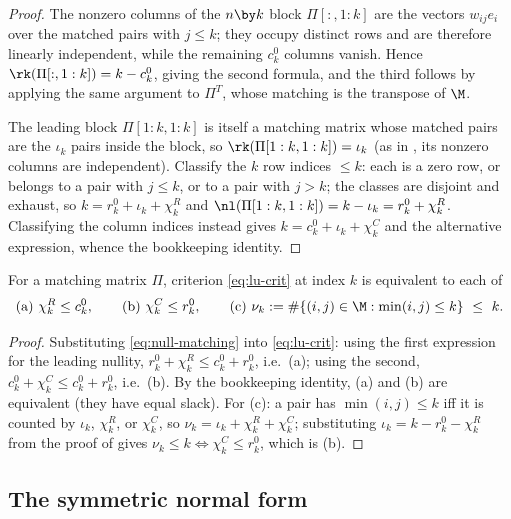 \begin{proof}
  The nonzero columns of the $n \by k$ block $\Pi[:,1:k]$ are the vectors
  $w_{ij} e_i$ over the matched pairs with $j \le k$; they occupy distinct
  rows and are therefore linearly independent, while the remaining $c^0_k$
  columns vanish.  Hence $\rk(\Pi[:,1:k]) = k - c^0_k$, giving the second
  formula, and the third follows by applying the same argument to $\Pi^T$,
  whose matching is the transpose of $\M$.

  The leading block $\Pi[1:k,1:k]$ is itself a matching matrix whose
  matched pairs are the $\iota_k$ pairs inside the block, so
  $\rk(\Pi[1:k,1:k]) = \iota_k$ (as in , its nonzero
  columns are independent).  Classify the $k$ row indices $\le k$: each is
  a zero row, or belongs to a pair with $j \le k$, or to a pair with
  $j > k$; the classes are disjoint and exhaust, so
  $k = r^0_k + \iota_k + \chi^R_k$ and
  $\nl(\Pi[1:k,1:k]) = k - \iota_k = r^0_k + \chi^R_k$.  Classifying the
  column indices instead gives $k = c^0_k + \iota_k + \chi^C_k$ and the
  alternative expression, whence the bookkeeping identity.
\end{proof}

\begin{lemma}\label{lem:comb-lu}
  For a matching matrix $\Pi$, criterion \cref{eq:lu-crit} at index $k$ is
  equivalent to each of
  \[
    \text{(a) } \chi^R_k \le c^0_k,
    \qquad
    \text{(b) } \chi^C_k \le r^0_k,
    \qquad
    \text{(c) } \nu_k := \#\{(i,j) \in \M : \min(i,j) \le k\} \ \le\ k .
  \]
\end{lemma}

\begin{proof}
  Substituting \cref{eq:null-matching} into \cref{eq:lu-crit}: using the
  first expression for the leading nullity,
  $r^0_k + \chi^R_k \le c^0_k + r^0_k$, i.e.\ (a); using the second,
  $c^0_k + \chi^C_k \le c^0_k + r^0_k$, i.e.\ (b).  By the bookkeeping
  identity, (a) and (b) are equivalent (they have equal slack).  For (c):
  a pair has $\min(i,j) \le k$ iff it is counted by $\iota_k$, $\chi^R_k$,
  or $\chi^C_k$, so $\nu_k = \iota_k + \chi^R_k + \chi^C_k$; substituting
  $\iota_k = k - r^0_k - \chi^R_k$ from the proof of
   gives
  $\nu_k \le k \iff \chi^C_k \le r^0_k$, which is (b).
\end{proof}

\subsection{The symmetric normal form}

